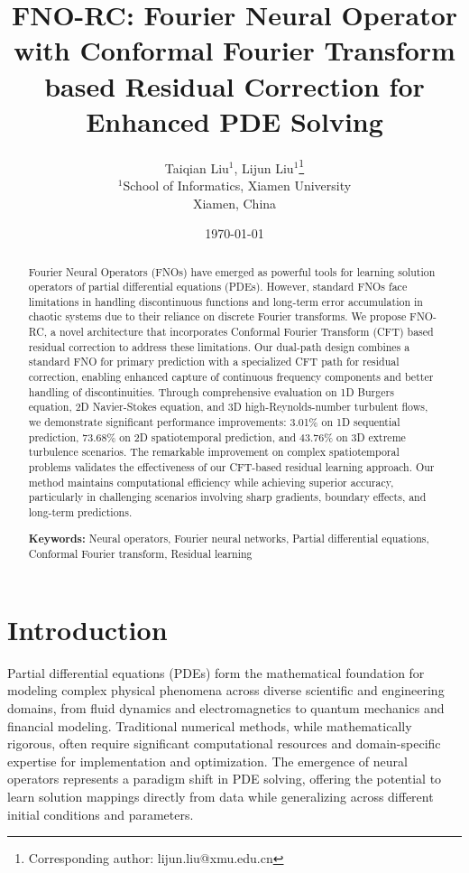 \documentclass[11pt]{article}
\title{FNO-RC: Fourier Neural Operator with Conformal Fourier Transform based Residual Correction for Enhanced PDE Solving}
\author{
    Taiqian Liu$^{1}$, Lijun Liu$^{1}$\thanks{Corresponding author: lijun.liu@xmu.edu.cn} \\
    $^{1}$School of Informatics, Xiamen University \\
    Xiamen, China
}
\date{\today}
\begin{document}
\maketitle

\begin{abstract}
Fourier Neural Operators (FNOs) have emerged as powerful tools for learning solution operators of partial differential equations (PDEs). However, standard FNOs face limitations in handling discontinuous functions and long-term error accumulation in chaotic systems due to their reliance on discrete Fourier transforms. We propose FNO-RC, a novel architecture that incorporates Conformal Fourier Transform (CFT) based residual correction to address these limitations. Our dual-path design combines a standard FNO for primary prediction with a specialized CFT path for residual correction, enabling enhanced capture of continuous frequency components and better handling of discontinuities. Through comprehensive evaluation on 1D Burgers equation, 2D Navier-Stokes equation, and 3D high-Reynolds-number turbulent flows, we demonstrate significant performance improvements: 3.01\% on 1D sequential prediction, 73.68\% on 2D spatiotemporal prediction, and 43.76\% on 3D extreme turbulence scenarios. The remarkable improvement on complex spatiotemporal problems validates the effectiveness of our CFT-based residual learning approach. Our method maintains computational efficiency while achieving superior accuracy, particularly in challenging scenarios involving sharp gradients, boundary effects, and long-term predictions.

\textbf{Keywords:} Neural operators, Fourier neural networks, Partial differential equations, Conformal Fourier transform, Residual learning
\end{abstract}

\section{Introduction}

Partial differential equations (PDEs) form the mathematical foundation for modeling complex physical phenomena across diverse scientific and engineering domains, from fluid dynamics and electromagnetics to quantum mechanics and financial modeling. Traditional numerical methods, while mathematically rigorous, often require significant computational resources and domain-specific expertise for implementation and optimization. The emergence of neural operators represents a paradigm shift in PDE solving, offering the potential to learn solution mappings directly from data while generalizing across different initial conditions and parameters.
\end{document}
